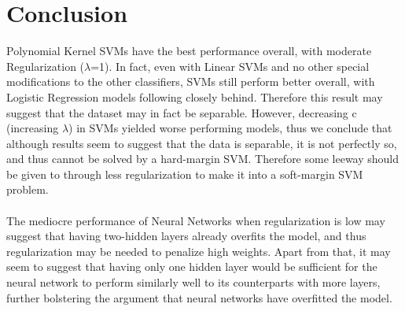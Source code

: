 \documentclass[11pt, oneside]{article}
\begin{document}
\section *{Conclusion}
Polynomial Kernel SVMs have the best performance overall, with moderate Regularization ($\lambda$=1). In fact, even with Linear SVMs and no other special modifications to the other classifiers, SVMs still perform better overall, with Logistic Regression models following closely behind. Therefore this result may suggest that the dataset may in fact be separable. However, decreasing c (increasing $\lambda$) in SVMs yielded worse performing models, thus we conclude that although results seem to suggest that the data is separable, it is not perfectly so, and thus cannot be solved by a hard-margin SVM. Therefore some leeway should be given to through less regularization to make it into a soft-margin SVM problem.\\\\
The mediocre performance of Neural Networks when regularization is low may suggest that having two-hidden layers already overfits the model, and thus regularization may be needed to penalize high weights. Apart from that, it may seem to suggest that having only one hidden layer would be sufficient for the neural network to perform similarly well to its counterparts with more layers, further bolstering the argument that neural networks have overfitted the model. 
\end{document}
